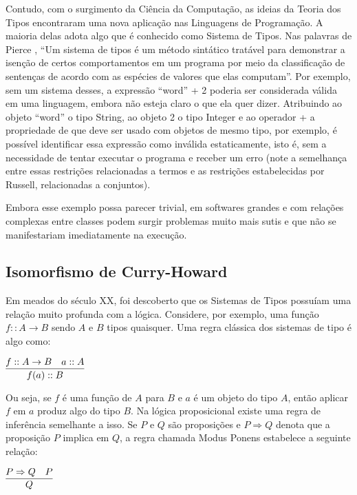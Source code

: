 \documentclass[12pt, oneside, a4paper,english,brazil]{abntex2}
\begin{document}
\qquad Contudo, com o surgimento da Ciência da Computação, as ideias da Teoria dos Tipos
encontraram uma nova aplicação nas Linguagens de Programação. A maioria delas adota
algo que é conhecido como Sistema de Tipos. Nas palavras de Pierce \cite{pierce}, ``Um sistema de
tipos é um método sintático tratável para demonstrar a isenção de certos comportamentos
em um programa por meio da classificação de senten\c{c}as de acordo com as espécies de valores
que elas computam''. Por exemplo, sem um sistema desses, a expressão \textsf{``word'' + 2} poderia
ser considerada válida em uma linguagem, embora não esteja claro o que ela quer dizer.
Atribuindo ao objeto \textsf{``word''} o tipo String, ao objeto \textsf{2} o tipo Integer e ao operador
\textsf{+} a propriedade de que deve ser usado com objetos de mesmo tipo, por exemplo, é
possível identificar essa expressão como inválida estaticamente, isto \'e, sem a necessidade de tentar executar o programa e receber um erro (note a
semelhança entre essas restrições relacionadas a termos e as restrições estabelecidas por
Russell, relacionadas a conjuntos).

\qquad Embora esse exemplo possa parecer trivial, em softwares grandes e com relações
complexas entre classes podem surgir problemas muito mais sutis e que não se manifestariam
imediatamente na execução.

\subsection*{Isomorfismo de Curry-Howard}
\qquad Em meados do século XX, foi descoberto que os Sistemas de Tipos possuíam uma
relação muito profunda com a lógica. Considere, por exemplo, uma função $f :: A \rightarrow B$
sendo $A$ e $B$ tipos quaisquer. Uma regra clássica dos sistemas de tipo é algo como:

\begin{center}
  $\infer{f(a) :: B}{f :: A \rightarrow B & a :: A}$
\end{center}

\qquad Ou seja, se $f$ é uma função de $A$ para $B$ e $a$ é um objeto do tipo $A$, então aplicar
$f$ em $a$ produz algo do tipo $B$. Na lógica proposicional existe uma regra de inferência
semelhante a isso. Se $P$ e $Q$ são proposições e $P \Rightarrow Q$ denota que a proposição $P$ implica
em $Q$, a regra chamada Modus Ponens estabelece a seguinte relação:

\begin{center}
  $\infer{Q}{P \Rightarrow Q & P}$
\end{center}
\end{document}
